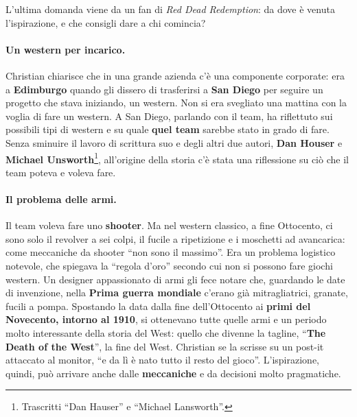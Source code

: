 L'ultima domanda viene da un fan di \emph{Red Dead Redemption}: da dove è venuta
l'ispirazione, e che consigli dare a chi comincia?

\paragraph{Un western per incarico.} Christian chiarisce che in una grande azienda
c'è una componente corporate: era a \textbf{Edimburgo} quando gli dissero di
trasferirsi a \textbf{San Diego} per seguire un progetto che stava iniziando, un
western. Non si era svegliato una mattina con la voglia di fare un western. A San
Diego, parlando con il team, ha riflettuto sui possibili tipi di western e su quale
\textbf{quel team} sarebbe stato in grado di fare. Senza sminuire il lavoro di
scrittura suo e degli altri due autori, \textbf{Dan Houser} e \textbf{Michael
Unsworth}\footnote{Trascritti ``Dan Hauser'' e ``Michael Lansworth''.}, all'origine
della storia c'è stata una riflessione su ciò che il team poteva e voleva fare.

\paragraph{Il problema delle armi.} Il team voleva fare uno \textbf{shooter}. Ma nel
western classico, a fine Ottocento, ci sono solo il revolver a sei colpi, il
fucile a ripetizione e i moschetti ad avancarica: come meccaniche da shooter ``non
sono il massimo''. Era un problema logistico notevole, che spiegava la ``regola
d'oro'' secondo cui non si possono fare giochi western. Un designer appassionato di
armi gli fece notare che, guardando le date di invenzione, nella \textbf{Prima
guerra mondiale} c'erano già mitragliatrici, granate, fucili a pompa. Spostando la
data dalla fine dell'Ottocento ai \textbf{primi del Novecento, intorno al 1910}, si
ottenevano tutte quelle armi e un periodo molto interessante della storia del West:
quello che divenne la tagline, ``\textbf{The Death of the West}'', la fine del West.
Christian se la scrisse su un post-it attaccato al monitor, ``e da lì è nato tutto
il resto del gioco''. L'ispirazione, quindi, può arrivare anche dalle
\textbf{meccaniche} e da decisioni molto pragmatiche.

